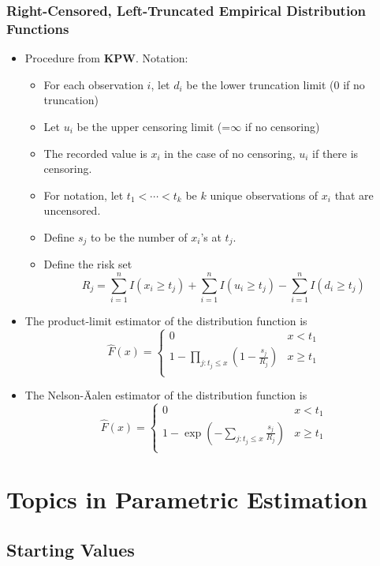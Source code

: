 \documentclass{beamer}
\begin{document}
\begin{frame}%
\frametitle{Right-Censored, Left-Truncated Empirical Distribution Functions}
\begin{itemize}
\item Procedure from \textbf{KPW}. Notation:
\begin{itemize} 
\item For each observation $i$, let $d_i$ be the lower truncation limit (0 if no truncation)
\item Let $u_i$ be the upper censoring limit (=$\infty$ if no censoring)
\item The recorded value is $x_i$ in the case of no censoring, $u_i$ if there is censoring.
\item For notation, let $t_1 < \cdots < t_k$ be $k$ unique observations of $x_i$ that are uncensored.
\item Define $s_j$ to be the number of $x_i$'s at $t_j$.
\item  Define the risk set
$$R_j = \sum_{i=1}^n I(x_i \geq t_{j}) + \sum_{i=1}^n I(u_i \geq t_{j}) - \sum_{i=1}^n I(d_i \geq t_{j})$$
\end{itemize}
\item  The product-limit estimator of the distribution function is
\[
\hat{F}(x)=
\left\lbrace
\begin{array}{llll}
0 &
x < t_{1} \\
1- \prod_{j:t_{j} \leq x}\left( 1-\frac{s_j}{R_{j}}\right)  &
x \geq t_{1}\\
\end{array}
\right .
\]
\item  The Nelson-\"{A}alen estimator of the distribution function is
$$\hat{F}(x)=
\left\lbrace
\begin{array}{llll}
0 &
x < t_{1} \\
1- \exp \left(-\sum_{j:t_{j} \leq x}\frac{s_j}{R_j} \right) &
x \geq t_{1}\\
\end{array}
\right.$$
\end{itemize}

\end{frame}

\section{Topics in Parametric Estimation}

\subsection{Starting Values}
\end{document}
